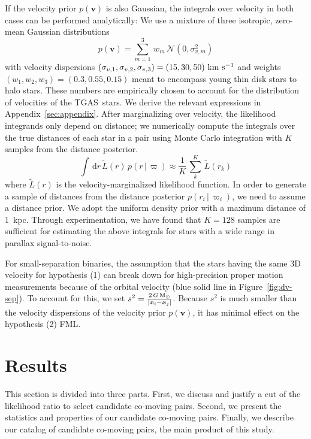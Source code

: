 \documentclass[manuscript, letterpaper]{aastex6}
\newcommand{\acronym}[1]{{\small{#1}}}
\newcommand{\tgas}{\acronym{TGAS}}
\newcommand{\given}{\,|\,}
\newcommand{\dd}{\mathrm{d}}
\newcommand{\bs}[1]{\boldsymbol{#1}}
\renewcommand{\vec}[1]{\bs{#1}}
\newcommand{\kms}{\ensuremath{\rm km~s^{-1}}}
\newcommand{\msun}{{\rm M}_\odot}
\begin{document}
If the velocity prior $p(\vec{v})$ is also Gaussian, the integrals over velocity
in both cases can be performed analytically:
We use a mixture of three isotropic, zero-mean Gaussian distributions
\begin{equation}
  p(\vec{v}) = \sum_{m=1}^3 \, w_m \, \mathcal{N}(0, \sigma_{v,m}^2)
  \label{eq:vprior}
\end{equation}
with velocity dispersions $(\sigma_{v,1}, \sigma_{v,2}, \sigma_{v,3}) = (15, 30, 50)
~\kms$ and weights $(w_1,w_2,w_3) = (0.3, 0.55, 0.15)$
meant to encompass young thin disk stars to halo stars.
These numbers are empirically chosen to account for the distribution of
velocities of the \tgas\ stars.
We derive the relevant expressions in Appendix~\ref{sec:appendix}.
After marginalizing over velocity, the likelihood integrands only depend on
distance; we numerically compute the integrals over the true distances of each
star in a pair using Monte Carlo integration with $K$ samples from
the distance posterior.
\begin{equation}
  \int \, \dd r \, \tilde{L}(r) \, p(r \given \varpi) \approx
    \frac{1}{K} \, \sum_k^K \, \tilde{L}(r_k)
\end{equation}
where $\tilde{L}(r)$ is the velocity-marginalized likelihood function.
In order to generate a sample of distances from the distance posterior $p(r_i \given \varpi_i)$,
we need to assume a distance prior. We adopt the uniform density prior
\citep{Bailer-Jones:2015aa} with a maximum distance of 1~kpc.
Through experimentation, we have found that $K=128$ samples are sufficient for
estimating the above integrals for stars with a wide range in parallax
signal-to-noise.

For small-separation binaries, the assumption that the stars having the same 3D velocity for
hypothesis (1) can
break down for high-precision proper motion measurements because of the orbital
velocity (blue solid line in Figure~\ref{fig:dv-sep}).
To account for this, we set $s^2 = \frac{2 \, G \, \msun}{|\vec{x}_i-\vec{x}_j|}$.
Because $s^2$ is much smaller than the velocity dispersions of the velocity prior
$p(\vec{v})$, it has minimal effect on the hypothesis (2) FML.


\section{Results} \label{sec:results}

This section is divided into three parts. First, we discuss and justify a cut of
the likelihood ratio to select candidate co-moving pairs.
Second, we present the statistics and properties of our candidate co-moving
pairs.
Finally, we describe our catalog of candidate co-moving pairs, the main product
of this study.
\end{document}
